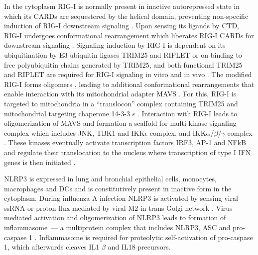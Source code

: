 		In the cytoplasm \gls{RIG-I} is normally present in inactive autorepressed state in which its \gls{CARD}s are sequestered by the helical domain, preventing non-specific induction of \gls{RIG-I} downstream signaling \parencite{Kowalinski2011}. Upon sensing its ligands by \gls{CTD}, \gls{RIG-I} undergoes conformational rearrangement which liberates \gls{RIG-I} \gls{CARD}s for downstream signaling \parencite{Kowalinski2011}. Signaling induction by \gls{RIG-I} is  dependent on its ubiquitination by E3 ubiquitin ligases TRIM25 and RIPLET or on binding to free polyubiquitin chains generated by TRIM25, and both functional TRIM25 and RIPLET are required for \gls{RIG-I} signaling in vitro and in vivo \parencite{Gack2007, Oshiumi2010, Zeng2010}. The modified \gls{RIG-I} forms oligomers \parencite{Patel2013}, leading to additional conformational rearrangements that enable interaction with its  mitochondrial adapter \gls{MAVS} \parencite{Kawai2005, Seth2005}. For this, \gls{RIG-I} is targeted to mitochondria in a ``translocon'' complex containing TRIM25 and mitochondrial targeting chaperone 14-3-3 $\epsilon$ \parencite{Liu2012}. Interaction with \gls{RIG-I} leads to oligomerization of \gls{MAVS} and formation a scaffold for multi-kinase signaling complex which includes \gls{JNK}, \gls{TBK1} and \gls{IKK}$\epsilon$ complex, and \gls{IKK}$\alpha$/$\beta$/$\gamma$ complex \parencite{McWhirter2005}. These kinases eventually activate transcription factors IRF3, AP-1 and \gls{NFkB} and regulate their translocation to the nucleus where transcription of type I \gls{IFN} genes is then initiated \parencite{McWhirter2005}. 
		
		\gls{NLRP3} is expressed in lung and bronchial epithelial cells, monocytes, macrophages and \gls{DC}s \parencite{Guarda2011, Kim2014} and is constitutively present in inactive form in the cytoplasm. During influenza A infection \gls{NLRP3} is activated by sensing viral \gls{ssRNA} or proton flux mediated by viral \gls{M2} in trans Golgi network \parencite{Thomas2009, Ichinohe2010, Allen2009}. Virus-mediated activation and oligomerization of \gls{NLRP3} leads to formation of inflammasome~--- a multiprotein complex that includes \gls{NLRP3}, \gls{ASC} and pro-caspase 1 \parencite{Tschopp2010}. Inflammasome is required for proteolytic self-activation of pro-caspase 1, which afterwards cleaves IL1 $\beta$ and IL18 precursors.

